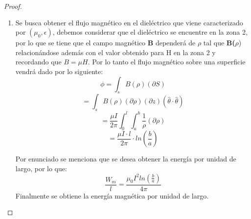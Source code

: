 \begin{proof}
\begin{enumerate}
        \item Se busca obtener el flujo magnético en el dieléctrico que viene caracterizado por $(\mu_{0},\epsilon)$, debemos considerar que el dieléctrico se encuentre en la zona 2, por lo que se tiene que el campo magnético \textbf{B} dependerá de $\rho$ tal que \textbf{B($\rho$}) relacionándose además con el valor obtenido para H en la zona 2 y recordando que $B = \mu H$. Por lo tanto el flujo magnético sobre una superficie vendrá dado por lo siguiente:
        \begin{equation}
            \phi = \int_{s} B(\rho)  (\partial S)
        \end{equation}
        \begin{equation}
                 = \int_{s} B(\rho) (\partial\rho)( \partial z) (\hat{\theta} \cdot \hat{\theta})
        \end{equation}
        \begin{equation}
                 = \frac{\mu I}{2\pi} \int_{0}^{l} \int_{a}^{b} \frac{1}{\rho} (\partial \rho)
        \end{equation}
        \begin{equation}
                 = \frac{\mu I \cdot l}{2\pi}\cdot ln\left(\frac{b}{a}\right)
        \end{equation}
        
        Por enunciado se menciona que se desea obtener la energía por unidad de largo, por lo que: 
        \begin{equation}
            \frac{W_{m}}{l}= \frac{\mu_{0} I^{2} ln(\frac{b}{a})}{4 \pi}
        \end{equation}
        Finalmente se obtiene la energía magnética por unidad de largo.
    \end{enumerate}
\end{proof}

